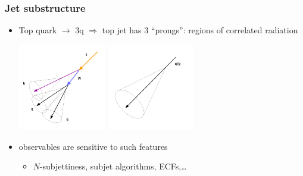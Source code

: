 \documentclass[aspectratio=169,xcolor=dvipsnames,,table,compress]{beamer}
\begin{document}
\begin{frame}[t]  \frametitle{Jet substructure}
  \begin{itemize}
    \item Top quark $\rightarrow$ 3q $\Rightarrow$ top jet has 3 ``prongs'': regions of correlated radiation
    \begin{center}
      \includegraphics[width=0.3\textwidth]{../figures/talk/topjet.pdf} \hspace{10mm}
      \includegraphics[width=0.3\textwidth]{../figures/talk/qgjet.pdf}
    \end{center}
    \item {} observables are sensitive to such features
    \begin{itemize}
      \item $N$-subjettiness, subjet algorithms, ECFs,\dots
    \end{itemize}
  \end{itemize}
\end{frame}
\end{document}

